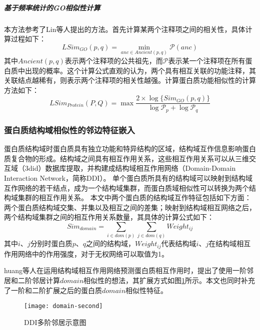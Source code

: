 \subparagraph*{基于频率统计的GO相似性计算}

本方法参考了Lin等人\cite{lin_information-theoretic_1998}提出的方法。首先计算某两个注释项之间的相关性，具体计算过程如下：
\begin{equation}
    \label{equ:feat:go:SimItemLin}
    LSim_{GO}(p,q)=\min_{anc \in Ancient(p,q)}\mathcal{P} (anc)
\end{equation}
其中$Ancient(p,q)$表示两个注释项的公共祖先，而$\mathcal{P}$表示某一个注释项在所有蛋白质中出现的概率。这个计算公式直观的认为，两个具有相互关联的功能注释，其关联结点越稀有，则表示两个注释项的相关性越强。计算蛋白质功能相似性的计算方法如下：
\begin{equation}
    \label{equ:feat:go:SimProteinLin}
    LSim_{Protein}(P,Q)=\max{\frac{2\times \log \{Sim_{GO}(p,q)\}}{\log {\mathcal{P}_p}+\log {\mathcal{P}_q}} }
\end{equation}

\subsubsection{蛋白质结构域相似性的邻边特征嵌入}

蛋白质结构域时蛋白质具有独立功能和特异结构的区域，结构域互作信息影响蛋白质复合物的形成\cite{kim_relating_2006}。结构域之间具有相互作用关系，这些相互作用关系可以从三维交互域（3did）数据库\cite{mosca_3did_2014}提取，并构建成结构域相互作用网络（Domain-Domain Interaction Network，简称DDI）。
单个蛋白质所具有的结构域可以映射到结构域互作网络的若干结点，成为一个结构域集群，而蛋白质域相似性可以转换为两个结构域集群的相互作用关系。
本文中两个蛋白质的结构域互作特征包括如下方面：两个蛋白质结构域交集、并集以及相互之间的差集；映射到结构域相互网络之后，两个结构域集群之间的相互作用关系数量，其具体的计算公式如下：
\begin{equation}
    \label{equ:feat:domain}
    Sim_{domain} = \sum_{i \in dom(p)}{\sum_{j \in dom(q)}{Weight_{ij}}}
\end{equation}
其中$i$、$j$分别时蛋白质$p$、$q$之间的结构域，$Weight_{ij}$代表结构域$i$、$j$在结构域相互作用网络中的作用强度，对于无权网络可以取值为1。

huang等人\cite{huang_protein-protein_2013}在运用结构域相互作用网络预测蛋白质相互作用时，提出了使用一阶邻居和二阶邻居计算$domain$相似性的想法，其扩展方式如图\ref{fig:domain-second}所示。本文也同时补充了一阶和二阶扩展之后的蛋白质$domain$相似性特征。
\begin{figure}[htbp]
    \centering
    \texttt{[image: domain-second]}
    \caption{DDI多阶邻居示意图}
    \label{fig:domain-second}
\end{figure}

